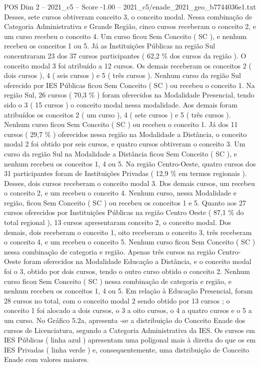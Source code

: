\begin{textsample}{POS Dim 2 – 2021\_c5 – Score -1.00 – 2021\_c5/enade\_2021\_geo\_b7744036e1.txt}
Desses, sete cursos obtiveram conceito 3, o conceito modal.
Nessa combinação de Categoria Administrativa e Grande Região, cinco cursos receberam o conceito 2, e um curso recebeu o conceito 4.
Um curso ficou Sem Conceito ( SC ), e nenhum recebeu os conceitos 1 ou 5.
Já as Instituições Públicas na região Sul concentraram 23 dos 37 cursos participantes ( 62,2 \% dos cursos da região ).
O conceito modal 3 foi atribuído a 12 cursos.
Os demais receberam os conceitos 2 ( dois cursos ), 4 ( seis cursos ) e 5 ( três cursos ).
Nenhum curso da região Sul oferecido por IES Públicas ficou Sem Conceito ( SC ) ou recebeu o conceito 1.
Na região Sul, 26 cursos ( 70,3 \% ) foram oferecidos na Modalidade Presencial, tendo sido o 3 ( 15 cursos ) o conceito modal nessa modalidade.
Aos demais foram atribuídos os conceitos 2 ( um curso ), 4 ( sete cursos ) e 5 ( três cursos ).
Nenhum curso ficou Sem Conceito ( SC ) ou recebeu o conceito 1.
Já dos 11 cursos ( 29,7 \% ) oferecidos nessa região na Modalidade a Distância, o conceito modal 2 foi obtido por seis cursos, e quatro cursos obtiveram o conceito 3.
Um curso da região Sul na Modalidade a Distância ficou Sem Conceito ( SC ), e nenhum recebeu os conceitos 1, 4 ou 5.
Na região Centro-Oeste, quatro cursos dos 31 participantes foram de Instituições Privadas ( 12,9 \% em termos regionais ).
Desses, dois cursos receberam o conceito modal 3.
Dos demais cursos, um recebeu o conceito 2, e um recebeu o conceito 4.
Nenhum curso, nessa Modalidade e região, ficou Sem Conceito ( SC ) ou recebeu os conceitos 1 e 5.
Quanto aos 27 cursos oferecidos por Instituições Públicas na região Centro Oeste ( 87,1 \% do total regional ), 13 cursos apresentaram conceito 2, o conceito modal.
Dos demais, dois receberam o conceito 1, oito receberam o conceito 3, três receberam o conceito 4, e um recebeu o conceito 5.
Nenhum curso ficou Sem Conceito ( SC ) nessa combinação de categoria e região.
Apenas três cursos na região Centro-Oeste foram oferecidos na Modalidade Educação a Distância, e o conceito modal foi o 3, obtido por dois cursos, tendo o outro curso obtido o conceito 2.
Nenhum curso ficou Sem Conceito ( SC ) nessa combinação de categoria e região, e nenhum recebeu os conceitos 1, 4 ou 5.
Em relação à Educação Presencial, foram 28 cursos no total, com o conceito modal 2 sendo obtido por 13 cursos ; o conceito 1 foi alocado a dois cursos, o 3 a oito cursos, o 4 a quatro cursos e o 5 a um curso.
No Gráfico 5.2a, apresenta -se a distribuição do Conceito Enade dos cursos de Licenciatura, segundo a Categoria Administrativa da IES.
Os cursos em IES Públicas ( linha azul ) apresentam uma poligonal mais à direita do que os em IES Privadas ( linha verde ) e, consequentemente, uma distribuição de Conceito Enade com valores maiores.

\end{textsample}
